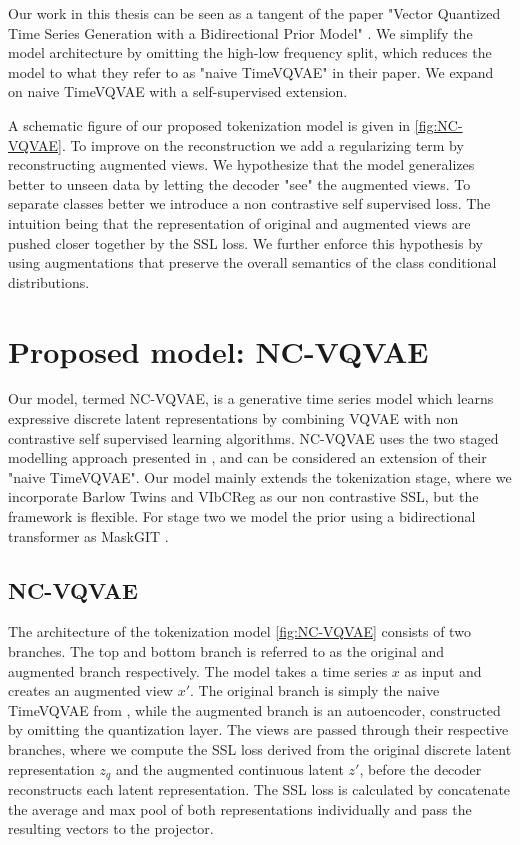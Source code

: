 \documentclass[../../thesis.tex]{subfiles}
\begin{document}
Our work in this thesis can be seen as a tangent of the paper "Vector Quantized Time Series Generation with a Bidirectional Prior Model" \cite{TimeVQVAE}. 
We simplify the model architecture by omitting the high-low frequency split, which reduces the model to what they refer to as "naive TimeVQVAE" in their paper. We expand on naive TimeVQVAE  with a self-supervised extension.\newline

A schematic figure of our proposed tokenization model is given in \ref{fig:NC-VQVAE}. To improve on the reconstruction we add a regularizing term by reconstructing augmented views. We hypothesize that the model generalizes better to unseen data by letting the decoder "see" the augmented views.\newline
To separate classes better we introduce a non contrastive self supervised loss. The intuition being that the representation of original and augmented views are pushed closer together by the SSL loss. We further enforce this hypothesis by using augmentations that preserve the overall semantics of the class conditional distributions. \newline

\section{Proposed model: NC-VQVAE}

Our model, termed NC-VQVAE, is a generative time series model which learns expressive discrete latent representations by combining VQVAE \cite{VQVAE} with non contrastive self supervised learning algorithms. NC-VQVAE uses the two staged modelling approach presented in \cite{TimeVQVAE}, and can be considered an extension of their "naive TimeVQVAE". Our model mainly extends the tokenization stage, where we incorporate Barlow Twins \cite{zbontar2021barlow} and VIbCReg \cite{lee2024computer} as our non contrastive SSL, but the framework is flexible. For stage two we model the prior using a bidirectional transformer as MaskGIT \cite{chang2022maskgit}.

\subsection{NC-VQVAE}

The architecture of the tokenization model \ref{fig:NC-VQVAE} consists of two branches. The top and bottom branch is referred to as the original and augmented branch respectively. The model takes a time series $x$ as input and creates an augmented view $x'$. The original branch is simply the naive TimeVQVAE from \cite{TimeVQVAE}, while the augmented branch is an autoencoder, constructed by omitting the quantization layer. The views are passed through their respective branches, where we compute the SSL loss derived from the original discrete latent representation $z_q$ and the augmented continuous latent $z'$, before the decoder reconstructs each latent representation. \newline 
The SSL loss is calculated by concatenate the average and max pool of both representations individually and pass the resulting vectors to the projector. \newline
\end{document}
